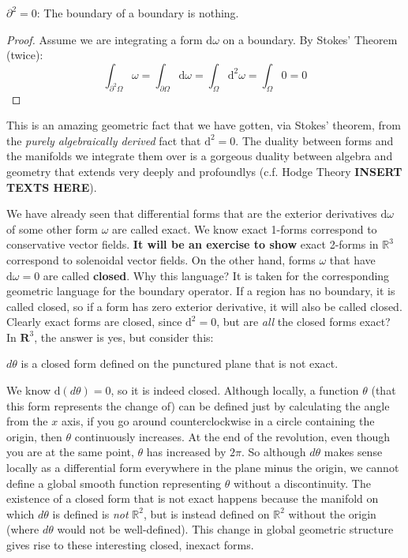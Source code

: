 	\begin{cor}
		$\partial^2 = 0$: The boundary of a boundary is nothing. 
	\end{cor}
	\begin{proof}
		Assume we are integrating a form $\mathrm d \omega$ on a boundary. By Stokes' Theorem (twice):
		\begin{equation*}
			\int_{\partial^2 \Omega} \omega = \int_{\partial \Omega} \mathrm d \omega = \int_{\Omega} \mathrm d^2 \omega = \int_\Omega 0 = 0
		\end{equation*}
	\end{proof}
	This is an amazing geometric fact that we have gotten, via Stokes' theorem, from the \emph{purely algebraically derived} fact that $\mathrm d^2 = 0$. The duality between forms and the manifolds we integrate them over is a gorgeous duality between algebra and geometry that extends very deeply and profoundlys (c.f. Hodge Theory \textbf{INSERT TEXTS HERE}).
	
	We have already seen that differential forms that are the exterior derivatives $\mathrm d \omega$ of some other form $\omega$ are called exact. We know exact 1-forms correspond to conservative vector fields. \textbf{It will be an exercise to show} exact 2-forms in $\mathbb R^3$ correspond to solenoidal vector fields. On the other hand, forms $\omega$ that have $\mathrm d \omega = 0$ are called \textbf{closed}. Why this language? It is taken for the corresponding geometric language for the boundary operator. If a region has no boundary, it is called closed, so if a form has zero exterior derivative, it will also be called closed. Clearly exact forms are closed, since $\mathrm d^2 = 0$, but are \emph{all} the closed forms exact? In $\mathbf{R}^3$, the answer is yes, but consider this:
	
	\begin{example}
		$d\theta$ is a closed form defined on the punctured plane that is not exact. 
	\end{example}
	
	We know $\mathrm d (d\theta) = 0$, so it is indeed closed. Although locally, a function $\theta$ (that this form represents the change of) can be defined just by calculating the angle from the $x$ axis, if you go around counterclockwise in a circle containing the origin, then $\theta$ continuously increases. At the end of the revolution, even though you are at the same point, $\theta$ has increased by $2\pi$. So although $d\theta$ makes sense locally as a differential form everywhere in the plane minus the origin, we cannot define a global smooth function representing $\theta$ without a discontinuity. The existence of a closed form that is not exact happens because the manifold on which $d\theta$ is defined is \emph{not} $\mathbb R^2$, but is instead defined on $\mathbb{R}^2$ without the origin (where $d\theta$ would not be well-defined). This change in global geometric structure gives rise to these interesting closed, inexact forms. 
	
